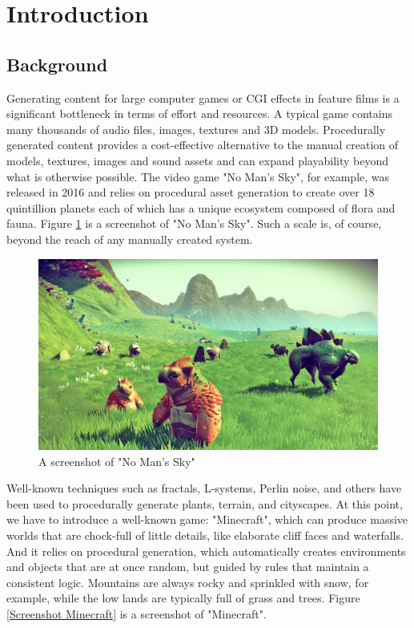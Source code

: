 \section{Introduction}
\label{sec:Introduction}

\subsection{Background}
Generating content for large computer games or CGI effects in feature films is a significant bottleneck in terms of effort and resources. A typical game contains many thousands of audio files, images, textures and 3D models. Procedurally generated content provides a cost-effective alternative to the manual creation of models, textures, images and sound assets and can expand playability beyond what is otherwise possible. The video game "No Man's Sky", for example, was released in 2016 and relies on procedural asset generation to create over 18 quintillion planets each of which has a unique ecosystem composed of flora and fauna. Figure \ref{Screenshot NoManSky} is a screenshot of "No Man's Sky". Such a scale is, of course, beyond the reach of any manually created system.

\begin{figure}[htb]
\centering
\includegraphics[width=.9\textwidth]{section01/assets/screenshot_NoManSky.jpeg}
\caption[A screenshot of "No Man's Sky"]{\label{Screenshot NoManSky}A screenshot of "No Man's Sky"}
\end{figure}

Well-known techniques such as fractals, L-systems, Perlin noise, and others have been used to procedurally generate plants, terrain, and cityscapes. At this point, we have to introduce a well-known game: "Minecraft", which can produce massive worlds that are chock-full of little details, like elaborate cliff faces and waterfalls. And it relies on procedural generation, which automatically creates environments and objects that are at once random, but guided by rules that maintain a consistent logic. Mountains are always rocky and sprinkled with snow, for example, while the low lands are typically full of grass and trees. Figure \ref{Screenshot Minecraft} is a screenshot of "Minecraft".

